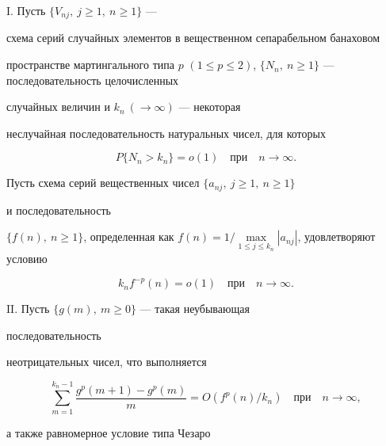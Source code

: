 \begin{thm}


$\mathrm I$. Пусть $\{V_{nj},\ j\geq 1,\ n \geq 1\}$ ---


схема серий случайных элементов в вещественном сепарабельном банаховом


пространстве мартингального типа $p$ $(1 \leq p


\leq 2)$, $\{N_n,\ n\geq 1\}$ --- последовательность целочисленных


случайных величин и $k_n\ (\rightarrow \infty)$ --- некоторая


неслучайная последовательность натуральных чисел, для которых


\begin{equation}


P\{N_n> k_n\}= o(1)\quad \text{при}\quad n\to\infty .


\end{equation}


Пусть схема серий вещественных чисел $\{a_{nj},\ j \geq 1,\ n \geq 1\}$


и последовательность


$\{f(n),\ n\geq 1\}$, определенная как $f(n)= 1/ \max\limits_{1\leq


j\leq k_n} |a_{nj}|$, удовлетворяют условию


\begin{equation}


k_n f^{-p}(n)= o(1)\quad\text{при}\quad n\to\infty .


\end{equation}





$\mathrm{II}$. Пусть $\{g(m),\ m\geq 0\}$ --- такая неубывающая 


последовательность


неотрицательных чисел, что выполняется


\begin{equation}


\sum_{m=1}^{k_n-1} \frac{g^{p}(m+1) -


g^{p}(m)}{m}= O(f^{p}(n)/k_n)\quad \text{при}\quad n\to\infty ,


\end{equation}


а также равномерное условие типа Чезаро


\begin{equation}



\end{equation}
\end{thm}
